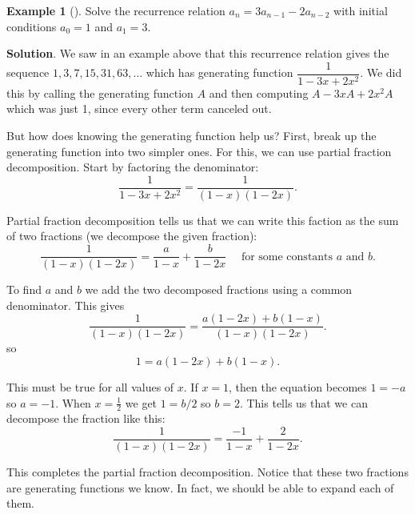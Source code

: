 \documentclass[10pt,]{book}
\theoremstyle{plain}
\theoremstyle{definition}
\theoremstyle{definition}
\newtheorem{example}[theorem]{Example}
\theoremstyle{definition}
\theoremstyle{definition}
\numberwithin{equation}{chapter}
\begin{document}
\begin{example}[]\label{example-27}
\hypertarget{p-1108}{}%
Solve the recurrence relation \(a_n = 3a_{n-1} - 2a_{n-2}\) with initial conditions \(a_0 = 1\) and \(a_1 = 3\).%
\par\smallskip%
\noindent\textbf{Solution}.\hypertarget{solution-101}{}\quad%
\hypertarget{p-1109}{}%
We saw in an example above that this recurrence relation gives the sequence \(1, 3, 7, 15, 31, 63, \ldots\) which has generating function \(\dfrac{1}{1 - 3x + 2x^2}\). We did this by calling the generating function \(A\) and then computing \(A - 3xA + 2x^2A\) which was just 1, since every other term canceled out.%
\par
\hypertarget{p-1110}{}%
But how does knowing the generating function help us? First, break up the generating function into two simpler ones. For this, we can use partial fraction decomposition. Start by factoring the denominator:%
\begin{equation*}
\frac{1}{1-3x + 2x^2} = \frac{1}{(1-x)(1-2x)}.
\end{equation*}
%
\par
\hypertarget{p-1111}{}%
Partial fraction decomposition tells us that we can write this faction as the sum of two fractions (we decompose the given fraction):%
\begin{equation*}
\frac{1}{(1-x)(1-2x)} = \frac{a}{1-x} + \frac{b}{1-2x} \text{ ~~ for some constants } a \text{ and } b.
\end{equation*}
%
\par
\hypertarget{p-1112}{}%
To find \(a\) and \(b\) we add the two decomposed fractions using a common denominator. This gives%
\begin{equation*}
\frac{1}{(1-x)(1-2x)} = \frac{a(1-2x) + b(1-x)}{(1-x)(1-2x)}.
\end{equation*}
so%
\begin{equation*}
1 = a(1-2x) + b(1-x).
\end{equation*}
%
\par
\hypertarget{p-1113}{}%
This must be true for all values of \(x\). If \(x = 1\), then the equation becomes \(1 = -a\) so \(a = -1\). When \(x = \frac{1}{2}\) we get \(1 = b/2\) so \(b = 2\). This tells us that we can decompose the fraction like this:%
\begin{equation*}
\frac{1}{(1-x)(1-2x)} = \frac{-1}{1-x} + \frac{2}{1-2x}.
\end{equation*}
%
\par
\hypertarget{p-1114}{}%
This completes the partial fraction decomposition. Notice that these two fractions are generating functions we know. In fact, we should be able to expand each of them.%

\end{example}
\end{document}
